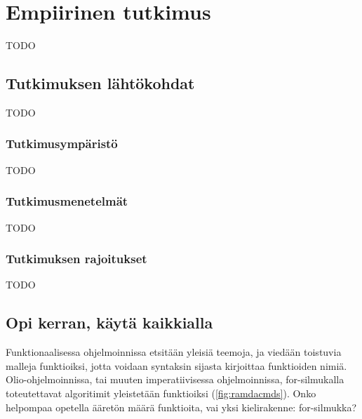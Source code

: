 \vspace{21.5pt}
\chapter{Empiirinen tutkimus}

TODO

\section{Tutkimuksen lähtökohdat}

TODO

\subsection{Tutkimusympäristö}

TODO

\subsection{Tutkimusmenetelmät}

TODO

\subsection{Tutkimuksen rajoitukset}

TODO


\section{Opi kerran, käytä kaikkialla}

Funktionaalisessa ohjelmoinnissa etsitään yleisiä teemoja, ja viedään toistuvia malleja funktioiksi, jotta voidaan syntaksin sijasta kirjoittaa funktioiden nimiä. Olio-ohjelmoinnissa, tai muuten imperatiivisessa ohjelmoinnissa, for-silmukalla toteutettavat algoritimit yleistetään funktioiksi (\ref{fig:ramdacmds}). Onko helpompaa opetella ääretön määrä funktioita, vai yksi kielirakenne: for-silmukka?


